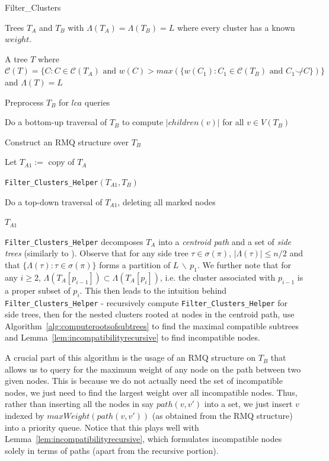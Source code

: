 \documentclass{article}
\newcommand{\compatible}{\smile}
\newcommand{\leafset}{\Lambda}
\begin{document}
    \begin{algorithm}
        \caption{Filter\_Clusters}
        \begin{algorithmic}[1]
            \Input Trees $T_A$ and $T_B$ with $\leafset(T_A) = \leafset(T_B) = L$ where every cluster has a known $weight$.

            \Output A tree $T$ where $\mathcal{C}(T) = \{C : C \in \mathcal{C}(T_A) \text{ and } w(C) > max(\{w(C_1) : C_1 \in \mathcal{C}(T_B) \text{ and } C_1 \not\compatible C\})\}$ and $\leafset(T) = L$

            \State Preprocess $T_B$ for $lca$ queries

            \State Do a bottom-up traversal of $T_B$ to compute $|children(v)|$ for all $v \in V(T_B)$

            \State Construct an RMQ structure over $T_B$

            \State Let $T_{A1} :=$ copy of $T_A$

            \State \texttt{Filter\_Clusters\_Helper}$(T_{A1}, T_B)$

            \State Do a top-down traversal of $T_{A1}$, deleting all marked nodes

            \State \Return $T_{A1}$
        \end{algorithmic}
    \end{algorithm}

    \texttt{Filter\_Clusters\_Helper} decomposes $T_A$ into a \textit{centroid path} and a set of \textit{side trees} (similarly to \cite{jansson2018algorithms}). Observe that for any side tree $\tau \in \sigma(\pi)$, $|\leafset(\tau)| \leq n/2$ and that $\{\leafset(\tau) : \tau \in \sigma(\pi)\}$ forms a partition of $L\, \backslash\, {p_1}$. We further note that for any $i \geq 2$, $\leafset(T_A[p_{i - 1}]) \subset \leafset(T_A[p_i])$, i.e. the cluster associated with $p_{i-1}$ is a proper subset of $p_i$. This then leads to the intuition behind \texttt{Filter\_Clusters\_Helper} - recursively compute \texttt{Filter\_Clusters\_Helper} for side trees, then for the nested clusters rooted at nodes in the centroid path, use Algorithm~\ref{alg:computerootsofsubtrees} to find the maximal compatible subtrees and Lemma~\ref{lem:incompatibilityrecursive} to find incompatible nodes.

    A crucial part of this algorithm is the usage of an RMQ structure on $T_B$ that allows us to query for the maximum weight of any node on the path between two given nodes. This is because we do not actually need the set of incompatible nodes, we just need to find the largest weight over all incompatible nodes. Thus, rather than inserting all the nodes in say $path(v, v')$ into a set, we just insert $v$ indexed by $maxWeight(path(v, v'))$ (as obtained from the RMQ structure) into a priority queue. Notice that this plays well with Lemma~\ref{lem:incompatibilityrecursive}, which formulates incompatible nodes solely in terms of paths (apart from the recursive portion).
\end{document}
